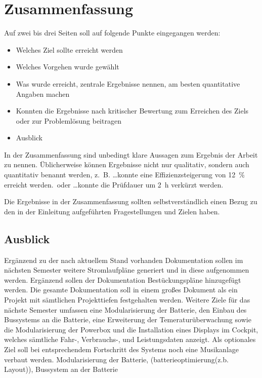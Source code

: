 \chapter{Zusammenfassung}
\label{cha:zusammenfassung}

Auf zwei bis drei Seiten soll auf folgende Punkte eingegangen werden:

\begin{itemize}
	\item Welches Ziel sollte erreicht werden
	\item Welches Vorgehen wurde gewählt
	\item Was wurde erreicht, zentrale Ergebnisse nennen, am besten quantitative Angaben machen
	\item Konnten die Ergebnisse nach kritischer Bewertung zum Erreichen des Ziels oder zur Problemlösung beitragen
	\item  Ausblick
\end{itemize}

In der Zusammenfassung sind unbedingt klare Aussagen zum Ergebnis der Arbeit zu nennen. Üblicherweise können Ergebnisse nicht nur qualitativ, sondern auch quantitativ benannt werden, z.~B. \glqq \ldots konnte eine Effizienzsteigerung von \SI{12}{\percent} erreicht werden.\grqq~oder \glqq \ldots konnte die Prüfdauer um \SI{2}{\hour} verkürzt werden\grqq.

Die Ergebnisse in der Zusammenfassung sollten selbstverständlich einen Bezug zu den in der Einleitung aufgeführten Fragestellungen und Zielen haben.
\section{Ausblick}
Ergänzend zu der nach aktuellem Stand vorhanden Dokumentation sollen im nächsten Semester weitere Stromlaufpläne generiert und in diese aufgenommen werden. Ergänzend sollen der Dokumentation Bestückungspläne hinzugefügt werden. Die gesamte Dokumentation soll in einem großes Dokument als ein Projekt mit sämtlichen Projekttiefen festgehalten werden. Weitere Ziele für das nächste Semester umfassen eine Modularisierung der Batterie, den Einbau des Bussystems an die Batterie, eine Erweiterung der Temeraturüberwachung sowie die Modularisierung der Powerbox und die Installation eines Displays im Cockpit, welches sämtliche Fahr-, Verbrauchs-, und Leistungsdaten anzeigt. Als optionales Ziel soll bei entsprechendem Fortschritt des Systems noch eine Musikanlage verbaut werden.
Modularisierung der Batterie, (batterieoptimierung(z.b. Layout)), Bussystem an der Batterie 
